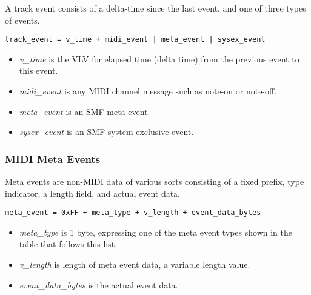    A track event consists of a delta-time since the last event, and one of
   three types of events.
 
   \texttt{track\_event = v\_time + midi\_event | meta\_event | sysex\_event}
 
   \begin{itemize}
      \item \textsl{v\_time} is the VLV for elapsed time
         (delta time) from the previous event to this event.
      \item \textsl{midi\_event} is any MIDI channel message such as note-on
         or note-off.
      \item \textsl{meta\_event} is an SMF meta event.
      \item \textsl{sysex\_event} is an SMF system exclusive event.
   \end{itemize}

\subsubsection{MIDI Meta Events}
\label{subsubsec:midi_meta_events}

   Meta events are non-MIDI data of various sorts consisting of a fixed prefix,
   type indicator, a length field, and actual event data.
 
   \texttt{meta\_event = 0xFF + meta\_type + v\_length + event\_data\_bytes}

   \begin{itemize}
      \item \textsl{meta\_type} is 1 byte, expressing one of the meta event
         types shown in the table that follows this list.
      \item \textsl{v\_length} is length of meta event data, a variable
         length value.
      \item \textsl{event\_data\_bytes} is the actual event data.
   \end{itemize}

